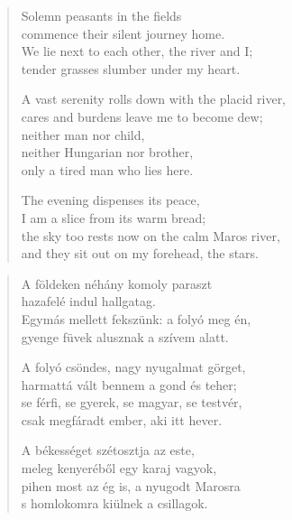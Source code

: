 \documentclass[11pt]{extbook}
\newcommand*{\centeredornament}{\centerline{\pgfornament[width=6cm]{88}}}
\begin{document}
\begin{verse}
  Solemn peasants in the fields \\
  commence their silent journey home. \\
  We lie next to each other, the river and I; \\
  tender grasses slumber under my heart.

  A vast serenity rolls down with the placid river,\hspace*{-2mm} \\
  cares and burdens leave me to become dew; \\
  neither man nor child, \\
  neither Hungarian nor brother, \\
  only a tired man who lies here.

  The evening dispenses its peace, \\
  I am a slice from its warm bread; \\
  the sky too rests now on the calm Maros river,\hspace*{-1mm} \\
  and they sit out on my forehead, the stars.
\end{verse}

\newpage

\vspace*{-15mm}
\centeredornament



\begin{verse}
  A földeken néhány komoly paraszt \\
  hazafelé indul hallgatag. \\
  Egymás mellett fekszünk: a folyó meg én, \\
  gyenge füvek alusznak a szívem alatt.

  A folyó csöndes, nagy nyugalmat görget, \\
  harmattá vált bennem a gond és teher; \\
  se férfi, se gyerek, se magyar, se testvér, \\
  csak megfáradt ember, aki itt hever.

  A békességet szétosztja az este, \\
  meleg kenyeréből egy karaj vagyok, \\
  pihen most az ég is, a nyugodt Marosra \\
  s homlokomra kiülnek a csillagok.
\end{verse}
\end{document}
